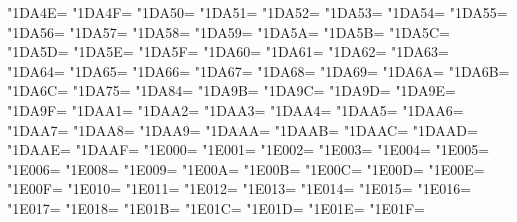 \XeTeXcharclass"1DA4E=\KclassCM
\XeTeXcharclass"1DA4F=\KclassCM
\XeTeXcharclass"1DA50=\KclassCM
\XeTeXcharclass"1DA51=\KclassCM
\XeTeXcharclass"1DA52=\KclassCM
\XeTeXcharclass"1DA53=\KclassCM
\XeTeXcharclass"1DA54=\KclassCM
\XeTeXcharclass"1DA55=\KclassCM
\XeTeXcharclass"1DA56=\KclassCM
\XeTeXcharclass"1DA57=\KclassCM
\XeTeXcharclass"1DA58=\KclassCM
\XeTeXcharclass"1DA59=\KclassCM
\XeTeXcharclass"1DA5A=\KclassCM
\XeTeXcharclass"1DA5B=\KclassCM
\XeTeXcharclass"1DA5C=\KclassCM
\XeTeXcharclass"1DA5D=\KclassCM
\XeTeXcharclass"1DA5E=\KclassCM
\XeTeXcharclass"1DA5F=\KclassCM
\XeTeXcharclass"1DA60=\KclassCM
\XeTeXcharclass"1DA61=\KclassCM
\XeTeXcharclass"1DA62=\KclassCM
\XeTeXcharclass"1DA63=\KclassCM
\XeTeXcharclass"1DA64=\KclassCM
\XeTeXcharclass"1DA65=\KclassCM
\XeTeXcharclass"1DA66=\KclassCM
\XeTeXcharclass"1DA67=\KclassCM
\XeTeXcharclass"1DA68=\KclassCM
\XeTeXcharclass"1DA69=\KclassCM
\XeTeXcharclass"1DA6A=\KclassCM
\XeTeXcharclass"1DA6B=\KclassCM
\XeTeXcharclass"1DA6C=\KclassCM
\XeTeXcharclass"1DA75=\KclassCM
\XeTeXcharclass"1DA84=\KclassCM
\XeTeXcharclass"1DA9B=\KclassCM
\XeTeXcharclass"1DA9C=\KclassCM
\XeTeXcharclass"1DA9D=\KclassCM
\XeTeXcharclass"1DA9E=\KclassCM
\XeTeXcharclass"1DA9F=\KclassCM
\XeTeXcharclass"1DAA1=\KclassCM
\XeTeXcharclass"1DAA2=\KclassCM
\XeTeXcharclass"1DAA3=\KclassCM
\XeTeXcharclass"1DAA4=\KclassCM
\XeTeXcharclass"1DAA5=\KclassCM
\XeTeXcharclass"1DAA6=\KclassCM
\XeTeXcharclass"1DAA7=\KclassCM
\XeTeXcharclass"1DAA8=\KclassCM
\XeTeXcharclass"1DAA9=\KclassCM
\XeTeXcharclass"1DAAA=\KclassCM
\XeTeXcharclass"1DAAB=\KclassCM
\XeTeXcharclass"1DAAC=\KclassCM
\XeTeXcharclass"1DAAD=\KclassCM
\XeTeXcharclass"1DAAE=\KclassCM
\XeTeXcharclass"1DAAF=\KclassCM
\XeTeXcharclass"1E000=\KclassCM
\XeTeXcharclass"1E001=\KclassCM
\XeTeXcharclass"1E002=\KclassCM
\XeTeXcharclass"1E003=\KclassCM
\XeTeXcharclass"1E004=\KclassCM
\XeTeXcharclass"1E005=\KclassCM
\XeTeXcharclass"1E006=\KclassCM
\XeTeXcharclass"1E008=\KclassCM
\XeTeXcharclass"1E009=\KclassCM
\XeTeXcharclass"1E00A=\KclassCM
\XeTeXcharclass"1E00B=\KclassCM
\XeTeXcharclass"1E00C=\KclassCM
\XeTeXcharclass"1E00D=\KclassCM
\XeTeXcharclass"1E00E=\KclassCM
\XeTeXcharclass"1E00F=\KclassCM
\XeTeXcharclass"1E010=\KclassCM
\XeTeXcharclass"1E011=\KclassCM
\XeTeXcharclass"1E012=\KclassCM
\XeTeXcharclass"1E013=\KclassCM
\XeTeXcharclass"1E014=\KclassCM
\XeTeXcharclass"1E015=\KclassCM
\XeTeXcharclass"1E016=\KclassCM
\XeTeXcharclass"1E017=\KclassCM
\XeTeXcharclass"1E018=\KclassCM
\XeTeXcharclass"1E01B=\KclassCM
\XeTeXcharclass"1E01C=\KclassCM
\XeTeXcharclass"1E01D=\KclassCM
\XeTeXcharclass"1E01E=\KclassCM
\XeTeXcharclass"1E01F=\KclassCM
